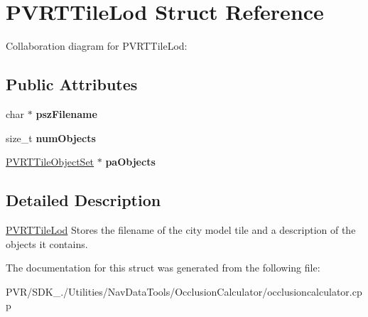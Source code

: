 \hypertarget{struct_p_v_r_t_tile_lod}{\section{P\+V\+R\+T\+Tile\+Lod Struct Reference}
\label{struct_p_v_r_t_tile_lod}
}


Collaboration diagram for P\+V\+R\+T\+Tile\+Lod\+:
\subsection*{Public Attributes}
\begin{DoxyCompactItemize}
\item 
\hypertarget{struct_p_v_r_t_tile_lod_a52a605b4edba512d92c17f18a331837a}{char $\ast$ {\bfseries psz\+Filename}}\label{struct_p_v_r_t_tile_lod_a52a605b4edba512d92c17f18a331837a}

\item 
\hypertarget{struct_p_v_r_t_tile_lod_a63d08a0ae2065bd588f84a95fb713bf9}{size\+\_\+t {\bfseries num\+Objects}}\label{struct_p_v_r_t_tile_lod_a63d08a0ae2065bd588f84a95fb713bf9}

\item 
\hypertarget{struct_p_v_r_t_tile_lod_a49337aa37a7769d20890a2e95c9b9bbf}{\hyperlink{struct_p_v_r_t_tile_object_set}{P\+V\+R\+T\+Tile\+Object\+Set} $\ast$ {\bfseries pa\+Objects}}\label{struct_p_v_r_t_tile_lod_a49337aa37a7769d20890a2e95c9b9bbf}

\end{DoxyCompactItemize}


\subsection{Detailed Description}


  \hyperlink{struct_p_v_r_t_tile_lod}{P\+V\+R\+T\+Tile\+Lod}  Stores the filename of the city model tile and a description of the objects it contains. 

The documentation for this struct was generated from the following file\+:\begin{DoxyCompactItemize}
\item 
P\+V\+R/\+S\+D\+K\+\_./\+Utilities/\+Nav\+Data\+Tools/\+Occlusion\+Calculator/occlusioncalculator.\+cpp\end{DoxyCompactItemize}
